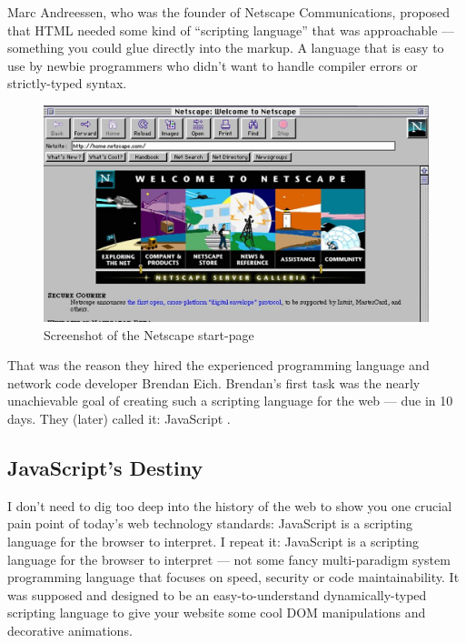 \documentclass[10pt]{article}  %
\begin{document}
\begin{sloppypar}
  Marc Andreessen, who was the founder of Netscape Communications, proposed that HTML needed some kind of “scripting language” that was approachable — something you could glue directly into the markup. A language that is easy to use by newbie programmers who didn’t want to handle compiler errors or strictly-typed syntax.

  \begin{figure}[ht]
    \centering
    \includegraphics[width=\textwidth]{figures/002.jpg}
    \caption{Screenshot of the Netscape start-page \citep{npr_home_nodate}}
    \label{fig:netscape}
  \end{figure}

  That was the reason they hired the experienced programming language and network code developer Brendan Eich. Brendan’s first task was the nearly unachievable goal of creating such a scripting language for the web — due in 10 days. They (later) called it: JavaScript \citep{severance_javascript_2012}.

  \subsection{JavaScript’s Destiny}
  \label{sec:javascript-destiny}

  I don’t need to dig too deep into the history of the web to show you one crucial pain point of today’s web technology standards: JavaScript is a scripting language for the browser to interpret. I repeat it: JavaScript is a scripting language for the browser to interpret — not some fancy multi-paradigm system programming language that focuses on speed, security or code maintainability. It was supposed and designed to be an easy-to-understand dynamically-typed scripting language to give your website some cool DOM manipulations and decorative animations.


\end{sloppypar}
\end{document}
